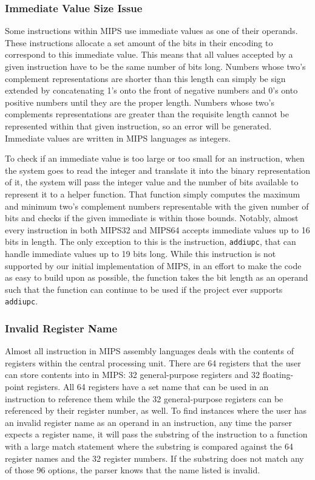 \documentclass[
    paper=letter,
    parskip=half,
    fontsize=12pt,
    titlepage=firstiscover,
    toc=bibliography,
    numbers=endperiod
]{scrartcl}
\begin{document}
\subsubsection{Immediate Value Size Issue}

Some instructions within MIPS use immediate values as one of their
operands. These instructions allocate a set amount of the bits in their
encoding to correspond to this immediate value. This means that all
values accepted by a given instruction have to be the same number of
bits long. Numbers whose two's complement representations are shorter
than this length can simply be sign extended by concatenating 1's onto
the front of negative numbers and 0's onto positive numbers until they
are the proper length. Numbers whose two's complements representations
are greater than the requisite length cannot be represented within that
given instruction, so an error will be generated. Immediate values are
written in MIPS languages as integers.

To check if an immediate value is too large or too small for an
instruction, when the system goes to read the integer and translate it
into the binary representation of it, the system will pass the integer
value and the number of bits available to represent it to a helper
function. That function simply computes the maximum and minimum two's
complement numbers representable with the given number of bits and
checks if the given immediate is within those bounds. Notably, almost
every instruction in both MIPS32 and MIPS64 accepts immediate values up
to 16 bits in length. The only exception to this is the instruction,
\texttt{addiupc}, that can handle immediate values up to 19 bits long.
While this instruction is not supported by our initial implementation of
MIPS, in an effort to make the code as easy to build upon as possible,
the function takes the bit length as an operand such that the function
can continue to be used if the project ever supports \texttt{addiupc}.

\subsubsection{Invalid Register Name}

Almost all instruction in MIPS assembly languages deals with the
contents of registers within the central processing unit. There are 64
registers that the user can store contents into in MIPS: 32
general-purpose registers and 32 floating-point registers. All 64
registers have a set name that can be used in an instruction to
reference them while the 32 general-purpose registers can be referenced
by their register number, as well. To find instances where the user has
an invalid register name as an operand in an instruction, any time the
parser expects a register name, it will pass the substring of the
instruction to a function with a large match statement where the
substring is compared against the 64 register names and the 32 register
numbers. If the substring does not match any of those 96 options, the
parser knows that the name listed is invalid.
\end{document}
